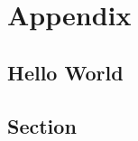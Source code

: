 \documentclass{note}
\begin{document}
% 

\chapter*{Appendix}

\lipsum[5-10]

\section*{Hello World}

\lipsum[10-20]

\section{Section}

\lipsum[5-10]


\end{document}
